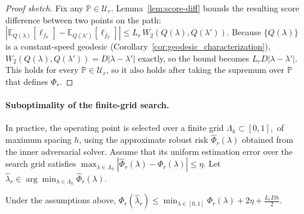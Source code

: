 \begin{proof}[Proof sketch]
Fix any $\mathbb{P}\in\mathcal U_r$. Lemma~\ref{lem:score-diff} bounds the resulting score difference between two points on the path: $|\mathbb E_{Q(\lambda)}[\ell_{f_\mathbb{P}}]-\mathbb E_{Q(\lambda')}[\ell_{f_\mathbb{P}}]|\le L_r\,W_2(Q(\lambda),Q(\lambda'))$. Because $\{Q(\lambda)\}$ is a constant-speed geodesic (Corollary~\ref{cor:geodesic_characterization}), $W_2(Q(\lambda),Q(\lambda'))=D|\lambda-\lambda'|$ exactly, so the bound becomes $L_rD|\lambda-\lambda'|$. This holds for every $\mathbb{P}\in\mathcal U_r$, so it also holds after taking the supremum over $\mathbb{P}$ that defines $\Phi_r$.
\end{proof}


\paragraph{Suboptimality of the finite-grid search.}
In practice, the operating point is selected over a finite grid
$
\Lambda_h
\subset[0,1],
$
of maximum spacing $h$, using
the approximate robust risk $
\widehat\Phi_r(\lambda)
$
obtained from the inner adversarial
solver. Assume that its uniform estimation
error over the search grid satisfies
$
\max_{\lambda\in\Lambda_h}
\left|
\widehat\Phi_r(\lambda)
-
\Phi_r(\lambda)
\right|
\le
\eta.
$
Let
$
\widehat\lambda_r
\in
\arg\min_{\lambda\in\Lambda_h}
\widehat\Phi_r(\lambda).
$
\begin{proposition}
Under the assumptions above,
$
\Phi_r(\widehat\lambda_r)
\le
\min_{\lambda\in[0,1]}
\Phi_r(\lambda)
+
2\eta
+
\frac{L_rDh}{2}.
$
\end{proposition}

